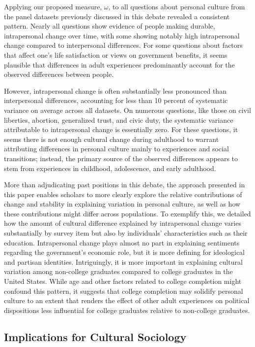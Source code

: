 \documentclass[
  12pt,
]{article}
\begin{document}
Applying our proposed measure, \(\omega\), to all questions about
personal culture from the panel datasets previously discussed in this
debate revealed a consistent pattern. Nearly all questions show evidence
of people making durable, intrapersonal change over time, with some
showing notably high intrapersonal change compared to interpersonal
differences. For some questions about factors that affect one's life
satisfaction or views on government benefits, it seems plausible that
differences in adult experiences predominantly account for the observed
differences between people.

However, intrapersonal change is often substantially less pronounced
than interpersonal differences, accounting for less than 10 percent of
systematic variance on average across all datasets. On numerous
questions, like those on civil liberties, abortion, generalized trust,
and civic duty, the systematic variance attributable to intrapersonal
change is essentially zero. For these questions, it seems there is not
enough cultural change during adulthood to warrant attributing
differences in personal culture mainly to experiences and social
transitions; instead, the primary source of the observed differences
appears to stem from experiences in childhood, adolescence, and early
adulthood.

More than adjudicating past positions in this debate, the approach
presented in this paper enables scholars to more clearly explore the
relative contributions of change and stability in explaining variation
in personal culture, as well as how these contributions might differ
across populations. To exemplify this, we detailed how the amount of
cultural difference explained by intrapersonal change varies
substantially by survey item but also by individuals' characteristics
such as their education. Intrapersonal change plays almost no part in
explaining sentiments regarding the government's economic role, but it
is more defining for ideological and partisan identities. Intriguingly,
it is more important in explaining cultural variation among non-college
graduates compared to college graduates in the United States. While age
and other factors related to college completion might confound this
pattern, it suggests that college completion may solidify personal
culture to an extent that renders the effect of other adult experiences
on political dispositions less influential for college graduates
relative to non-college graduates.

\hypertarget{implications-for-cultural-sociology}{%
\subsection{Implications for Cultural
Sociology}\label{implications-for-cultural-sociology}}
\end{document}
